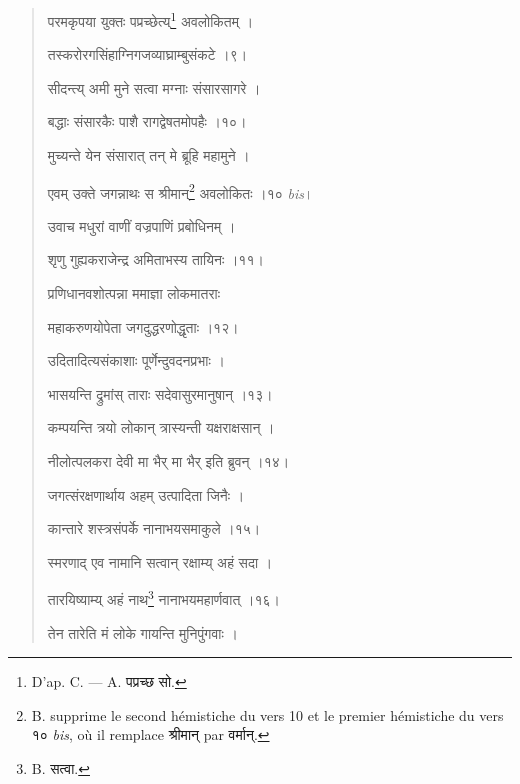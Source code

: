 \documentclass[a4paper, 11pt, oneside, french]{article}
\begin{document}
\begin{quotation}
\bigskip

\texthindi{परमकृपया युक्तः पप्रच्छेत्य्}\footnote{D'ap. C. --- A. \texthindi{पप्रच्छ सो}.} \texthindi{अवलोकितम् ।}

\texthindi{तस्करोरगसिंहाग्निगजव्याघ्राम्बुसंकटे ।९।}

\bigskip

\texthindi{सीदन्त्य् अमी मुने सत्वा मग्नाः संसारसागरे ।}

\texthindi{बद्धाः संसारकैः पाशै रागद्वेषतमोपहैः ।१०।}

\bigskip

\texthindi{मुच्यन्ते येन संसारात् तन् मे ब्रूहि महामुने ।}

\texthindi{एवम् उक्ते जगन्नाथः स श्रीमान्}\footnote{B. supprime le second hémistiche du vers 10 et le premier hémistiche du vers \texthindi{१०} \emph{bis}, où il remplace \texthindi{श्रीमान्} par \texthindi{वर्मान्}.} \texthindi{अवलोकितः ।१० }\emph{bis}\texthindi{।}

\bigskip

\texthindi{उवाच मधुरां वाणीं वज्रपाणिं प्रबोधिनम् ।}

\texthindi{शृणु गुह्यकराजेन्द्र अमिताभस्य तायिनः ।११।}

\bigskip

\texthindi{प्रणिधानवशोत्पन्ना ममाज्ञा लोकमातराः}

\texthindi{महाकरुणयोपेता जगदुद्धरणोद्धृताः ।१२।}

\bigskip

\texthindi{उदितादित्यसंकाशाः पूर्णेन्दुवदनप्रभाः ।}

\texthindi{भासयन्ति द्रुमांस् ताराः सदेवासुरमानुषान् ।१३।}

\bigskip

\texthindi{कम्पयन्ति त्रयो लोकान् त्रास्यन्ती यक्षराक्षसान् ।}

\texthindi{नीलोत्पलकरा देवी मा भैर् मा भैर् इति ब्रुवन् ।१४।}

\bigskip

\texthindi{जगत्संरक्षणार्थाय अहम् उत्पादिता जिनैः ।}

\texthindi{कान्तारे शस्त्रसंपर्के नानाभयसमाकुले ।१५।}

\bigskip

\texthindi{स्मरणाद् एव नामानि सत्वान् रक्षाम्य् अहं सदा ।}

\texthindi{तारयिष्याम्य् अहं नाथ}\footnote{B. \texthindi{सत्वा}.} \texthindi{नानाभयमहार्णवात् ।१६।}

\bigskip

\texthindi{तेन तारेति मं लोके गायन्ति मुनिपुंगवाः ।}


\end{quotation}
\end{document}
